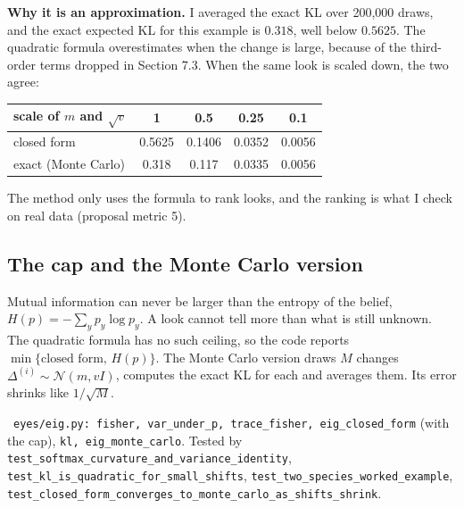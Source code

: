 \documentclass[11pt]{article}
\newcommand{\Code}{\par\smallskip\noindent{\sffamily\bfseries\color{headblue}In the code.}\ }
\begin{document}
\textbf{Why it is an approximation.} I averaged the exact KL over 200{,}000 draws, and the exact expected KL for this example is $0.318$, well below $0.5625$. The quadratic formula overestimates when the change is large, because of the third-order terms dropped in Section 7.3. When the same look is scaled down, the two agree:
\begin{center}
\begin{tabular}{lcccc}
\toprule
scale of $m$ and $\sqrt v$ & 1 & 0.5 & 0.25 & 0.1 \\
\midrule
closed form & 0.5625 & 0.1406 & 0.0352 & 0.0056 \\
exact (Monte Carlo) & 0.318 & 0.117 & 0.0335 & 0.0056 \\
\bottomrule
\end{tabular}
\end{center}
The method only uses the formula to rank looks, and the ranking is what I check on real data (proposal metric 5).

\subsection{The cap and the Monte Carlo version}

Mutual information can never be larger than the entropy of the belief, $H(p)=-\sum_yp_y\log p_y$. A look cannot tell more than what is still unknown. The quadratic formula has no such ceiling, so the code reports $\min\{\text{closed form},\,H(p)\}$. The Monte Carlo version draws $M$ changes $\Delta^{(i)}\sim\mathcal N(m,vI)$, computes the exact KL for each and averages them. Its error shrinks like $1/\sqrt M$.

\Code \texttt{eyes/eig.py: fisher, var\_\allowbreak{}under\_\allowbreak{}p, trace\_\allowbreak{}fisher, eig\_\allowbreak{}closed\_\allowbreak{}form} (with the cap), \texttt{kl, eig\_\allowbreak{}monte\_\allowbreak{}carlo}. Tested by \texttt{test\_\allowbreak{}softmax\_\allowbreak{}curvature\_\allowbreak{}and\_\allowbreak{}variance\_\allowbreak{}identity}, \texttt{test\_\allowbreak{}kl\_\allowbreak{}is\_\allowbreak{}quadratic\_\allowbreak{}for\_\allowbreak{}small\_\allowbreak{}shifts}, \texttt{test\_\allowbreak{}two\_\allowbreak{}species\_\allowbreak{}worked\_\allowbreak{}example}, \texttt{test\_\allowbreak{}closed\_\allowbreak{}form\_\allowbreak{}converges\_\allowbreak{}to\_\allowbreak{}monte\_\allowbreak{}carlo\_\allowbreak{}as\_\allowbreak{}shifts\_\allowbreak{}shrink}.

\end{document}
